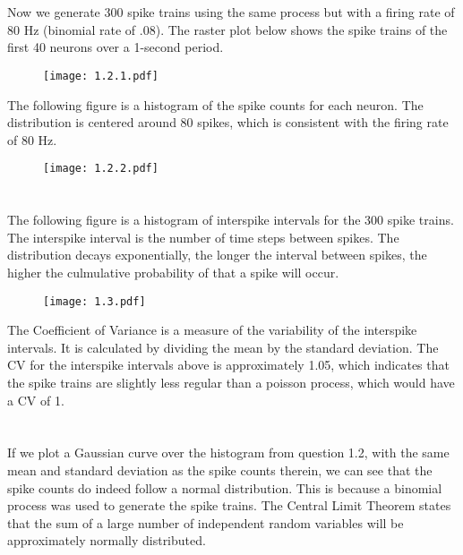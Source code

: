 \documentclass{article}
\begin{document}
\section{}
Now we generate 300 spike trains using the same process but with a firing rate of 80 Hz (binomial rate of .08). The raster plot below shows the spike trains of the first 40 neurons over a 1-second period.

\begin{figure}[ht]
    \centering
    \texttt{[image: 1.2.1.pdf]}
\end{figure}

The following figure is a histogram of the spike counts for each neuron. The distribution is centered around 80 spikes, which is consistent with the firing rate of 80 Hz.

\begin{figure}[ht]
    \centering
    \texttt{[image: 1.2.2.pdf]}
    \vspace{-10pt}
\end{figure}


\section{}
The following figure is a histogram of interspike intervals for the 300 spike trains. The interspike interval is the number of time steps between spikes. The distribution decays exponentially, the longer the interval between spikes, the higher the culmulative probability of that a spike will occur. 

\begin{figure}[ht]
    \centering
    \texttt{[image: 1.3.pdf]}
\end{figure}

The Coefficient of Variance is a measure of the variability of the interspike intervals. It is calculated by dividing the mean by the standard deviation. The CV for the interspike intervals above is approximately 1.05, which indicates that the spike trains are slightly less regular than a poisson process, which would have a CV of 1.
\vspace{6px}

\section{}
If we plot a Gaussian curve over the histogram from question 1.2, with the same mean and standard deviation as the spike counts therein, we can see that the spike counts do indeed follow a normal distribution. This is because a binomial process was used to generate the spike trains. The Central Limit Theorem states that the sum of a large number of independent random variables will be approximately normally distributed.
\end{document}
